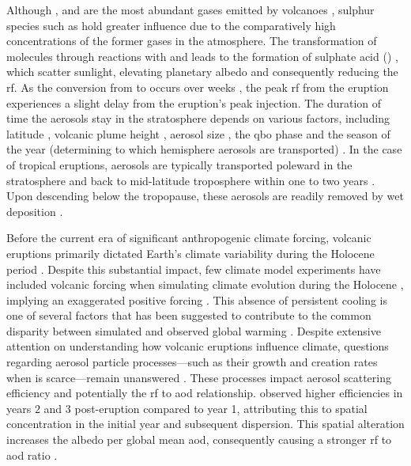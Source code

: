 \documentclass{ametsocV6.1}
\begin{document}
Although ,  and  are the most abundant gases emitted by volcanoes
\citep{robock2000}, sulphur species such as  hold greater influence due to the
comparatively high concentrations of the former gases in the atmosphere. The
transformation of  molecules through reactions with  and  leads
to the formation of sulphate acid () \citep{robock2000}, which scatter
sunlight, elevating planetary albedo and consequently reducing the \gls{rf}. As the
conversion from  to  occurs over weeks \citep{robock2000}, the peak
\gls{rf} from the eruption experiences a slight delay from the eruption's peak 
injection. The duration of time the  aerosols stay in the stratosphere depends
on various factors, including latitude \citep{marshall2019, toohey2019}, volcanic plume
height \citep{marshall2019}, aerosol size \citep{marshall2019}, the \gls{qbo} phase
\citep{pitari2016b} and the season of the year (determining to which hemisphere aerosols
are transported) \citep{toohey2011,toohey2019}. In the case of tropical eruptions,
aerosols are typically transported poleward in the stratosphere and back to mid-latitude
troposphere within one to two years \citep{robock2000}. Upon descending below the
tropopause, these aerosols are readily removed by wet deposition \citep{liu2012}.

Before the current era of significant anthropogenic climate forcing, volcanic eruptions
primarily dictated Earth's climate variability during the Holocene period
\citep{sigl2022}. Despite this substantial impact, few climate model experiments have
included volcanic forcing when simulating climate evolution during the Holocene
\citep{sigl2022}, implying an exaggerated positive forcing
\citep{gregory2016,solomon2011}. This absence of persistent cooling is one of several
factors that has been suggested to contribute to the common disparity between simulated
and observed global warming \citep{andersson2015}. Despite extensive attention on
understanding how volcanic eruptions influence climate, questions regarding aerosol
particle processes---such as their growth and creation rates when  is
scarce---remain unanswered
\citep[e.g.][]{robock2000,zanchettin2019,marshall2020,marshall2022}. These processes
impact aerosol scattering efficiency and potentially the \gls{rf} to \gls{aod}
relationship. \citet{marshall2020} observed higher efficiencies in years \(2\) and \(3\)
post-eruption compared to year 1, attributing this to spatial concentration in the
initial year and subsequent dispersion. This spatial alteration increases the albedo per
global mean \gls{aod}, consequently causing a stronger \gls{rf} to \gls{aod} ratio
\citep{marshall2020}.
\end{document}
